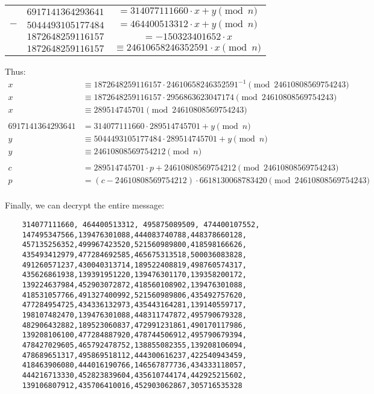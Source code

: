 \begin{Answer}
  \bigskip
  \centering
  \begin{tabular}{c | c | c |}
    & $6917141364293641$ & $= 314077111660 \cdot x + y \pmod n$ \\
    $-$ & $5044493105177484$ & $= 464400513312 \cdot x + y \pmod n$ \\
    \hline
    & $1872648259116157$ & $= -150323401652 \cdot x$\\
    \hline
    \hline
    & $1872648259116157$ & $\equiv 24610658246352591 \cdot x \pmod n$\\
    \hline
  \end{tabular}

  \flushleft{}
  Thus:
  \begin{align*}
    x &\equiv 1872648259116157 \cdot 24610658246352591^{-1} \pmod{24610808569754243} \\
    x &\equiv 1872648259116157 \cdot 2956863623047174 \pmod{24610808569754243} \\
    x &\equiv 289514745701 \pmod {24610808569754243} \\
    \\
    6917141364293641 &= 314077111660 \cdot 289514745701 + y \pmod n \\
    y &\equiv 5044493105177484 \cdot 289514745701 + y \pmod n \\
    y &\equiv 24610808569754212 \pmod n \\
    \\
    c &= 289514745701 \cdot p + 24610808569754212 \pmod{24610808569754243}\\
    p &= (c - 24610808569754212) \cdot 6618130068783420 \pmod{24610808569754243}\\
  \end{align*}

  \noindent
  Finally, we can decrypt the entire message:

  \begin{Verbatim}
    314077111660, 464400513312, 495875089509, 474400107552,
    147495347566,139476301088,444083740788,448378660128,
    457135256352,499967423520,521560989800,418598166626,
    435493412979,477284692585,465675313518,500036083828,
    491260571237,430040313714,189522408819,498760574317,
    435626861938,139391951220,139476301170,139358200172,
    139224637984,452903072872,418560108902,139476301088,
    418531057766,491327400992,521560989806,435492757620,
    477284954725,434336132973,435443164281,139140559717,
    198107482470,139476301088,448311747872,495790679328,
    482906432882,189523060837,472991231861,490170117986,
    139208106100,477284887920,478744506912,495790679394,
    478427029605,465792478752,138855082355,139208106094,
    478689651317,495869518112,444300616237,422540943459,
    418463906080,444016190766,146567877736,434333118057,
    444216713330,452823839604,435610744174,442925215602,
    139106807912,435706410016,452903062867,305716535328
  \end{Verbatim}


\end{Answer}
